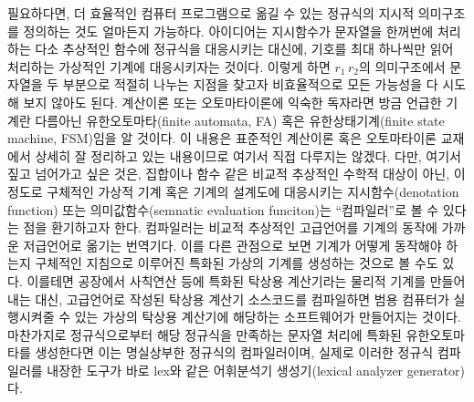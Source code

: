 \documentclass[b5paper,chapter,figtabcapt]{oblivoir}
\begin{document}
필요하다면, 더 효율적인 컴퓨터 프로그램으로 옮길 수 있는 정규식의
지시적 의미구조를 정의하는 것도 얼마든지 가능하다. 아이디어는
지시함수가 문자열을 한꺼번에 처리하는 다소 추상적인 함수에 정규식을
대응시키는 대신에, 기호를 최대 하나씩만 읽어 처리하는 가상적인 기계에
대응시키자는 것이다. 이렇게 하면 $r_1\,r_2$의 의미구조에서 문자열을
두 부분으로 적절히 나누는 지점을 찾고자 비효율적으로 모든 가능성을
다 시도해 보지 않아도 된다. 계산이론 또는 오토마타이론에 익숙한 독자라면
방금 언급한 기계란 다름아닌 유한오토마타(finite automata, FA) 혹은
유한상태기계(finite state machine, FSM)임을 알 것이다. 이 내용은
표준적인 계산이론 혹은 오토마타이론 교재\cite{Sipser2013,Hopcroft2007}에서
상세히 잘 정리하고 있는 내용이므로 여기서 직접 다루지는 않겠다.
다만, 여기서 짚고 넘어가고 싶은 것은, 집합이나 함수 같은 비교적
추상적인 수학적 대상이 아닌, 이정도로 구체적인 가상적 기계 혹은
기계의 설계도에 대응시키는 지시함수(denotation function) 또는
의미값함수(semnatic evaluation funciton)는 ``컴파일러''로
볼 수 있다는 점을 환기하고자 한다. 컴파일러는 비교적 추상적인
고급언어를 기계의 동작에 가까운 저급언어로 옮기는 번역기다.
이를 다른 관점으로 보면 기계가 어떻게 동작해야 하는지 구체적인
지침으로 이루어진 특화된 가상의 기계를 생성하는 것으로 볼 수도 있다.
이를테면 공장에서 사칙연산 등에 특화된 탁상용 계산기라는 물리적 기계를
만들어내는 대신, 고급언어로 작성된 탁상용 계산기 소스코드를 컴파일하면
범용 컴퓨터가 실행시켜줄 수 있는 가상의 탁상용 계산기에 해당하는
소프트웨어가 만들어지는 것이다. 마찬가지로 정규식으로부터 해당 정규식을
만족하는 문자열 처리에 특화된 유한오토마타를 생성한다면
이는 명실상부한 정규식의 컴파일러이며, 실제로 이러한 정규식 컴파일러를
내장한 도구가 바로 lex\cite{lex1990}와 같은
어휘분석기 생성기(lexical analyzer generator)다.
\end{document}
